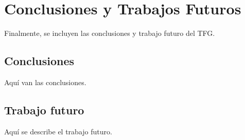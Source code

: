 \chapter{Conclusiones y Trabajos Futuros}
Finalmente, se incluyen las conclusiones y trabajo futuro del TFG.

\section{Conclusiones}
Aquí van las conclusiones.

\section{Trabajo futuro}
Aquí se describe el trabajo futuro.